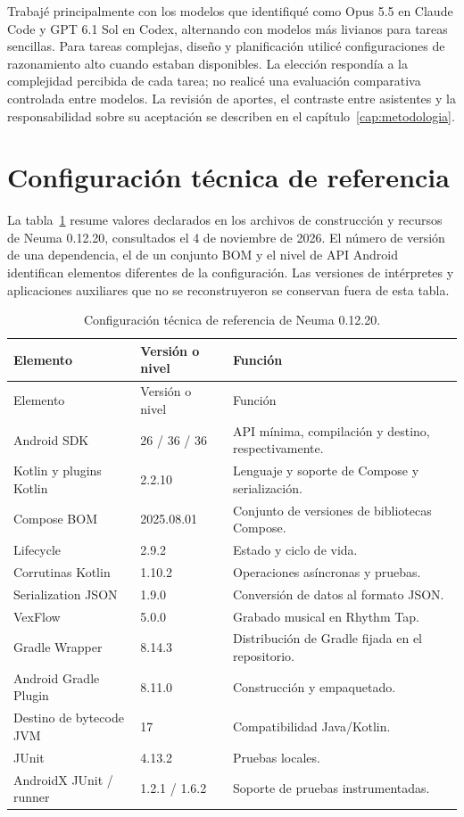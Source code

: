 Trabajé principalmente con los modelos que identifiqué como Opus 5.5 en Claude
Code y GPT 6.1 Sol en Codex, alternando con modelos más livianos para tareas
sencillas. Para tareas complejas, diseño y planificación utilicé configuraciones
de razonamiento alto cuando estaban disponibles. La elección respondía a la
complejidad percibida de cada tarea; no realicé una evaluación comparativa
controlada entre modelos. La revisión de aportes, el contraste entre asistentes
y la responsabilidad sobre su aceptación se describen en el
capítulo~\ref{cap:metodologia}.

\section{Configuración técnica de referencia}
\label{sec:herramientas-versiones}
La tabla~\ref{tab:versiones-herramientas} resume valores declarados en los archivos
de construcción y recursos de Neuma 0.12.20, consultados el 4 de noviembre de 2026.
El número de versión de una dependencia, el de un conjunto BOM y el nivel de API
Android identifican elementos diferentes de la configuración. Las versiones de
intérpretes y aplicaciones auxiliares que no se reconstruyeron se conservan fuera
de esta tabla.

\clearpage
\begingroup
\small
\singlespacing
\setlength{\tabcolsep}{4pt}
\setlength{\LTcapwidth}{\textwidth}
\begin{longtable}{p{}p{}p{}}
\caption{Configuración técnica de referencia de Neuma 0.12.20.}
\label{tab:versiones-herramientas}\\
\toprule
Elemento & Versión o nivel & Función \\
\midrule
\endfirsthead
\toprule
Elemento & Versión o nivel & Función \\
\midrule
\endhead
\bottomrule
\endfoot
Android SDK & 26 / 36 / 36 & API mínima, compilación y destino, respectivamente. \\
Kotlin y plugins Kotlin & 2.2.10 & Lenguaje y soporte de Compose y serialización. \\
Compose BOM & 2025.08.01 & Conjunto de versiones de bibliotecas Compose. \\
Lifecycle & 2.9.2 & Estado y ciclo de vida. \\
Corrutinas Kotlin & 1.10.2 & Operaciones asíncronas y pruebas. \\
Serialization JSON & 1.9.0 & Conversión de datos al formato JSON. \\
VexFlow & 5.0.0 & Grabado musical en Rhythm Tap. \\
Gradle Wrapper & 8.14.3 & Distribución de Gradle fijada en el repositorio. \\
Android Gradle Plugin & 8.11.0 & Construcción y empaquetado. \\
Destino de bytecode JVM & 17 & Compatibilidad Java/Kotlin. \\
JUnit & 4.13.2 & Pruebas locales. \\
AndroidX JUnit / runner & 1.2.1 / 1.6.2 & Soporte de pruebas instrumentadas. \\
\end{longtable}
\endgroup

